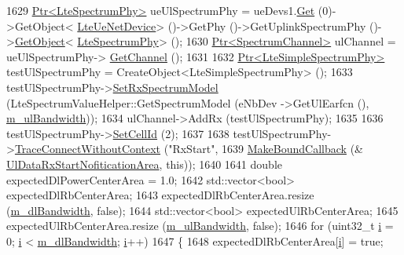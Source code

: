 \begin{DoxyCode}
1629   \hyperlink{classns3_1_1Ptr}{Ptr<LteSpectrumPhy>} ueUlSpectrumPhy = ueDevs1.\hyperlink{classns3_1_1NetDeviceContainer_a677d62594b5c9d2dea155cc5045f4d0b}{Get} (0)->GetObject<
      \hyperlink{classns3_1_1LteUeNetDevice}{LteUeNetDevice}> ()->GetPhy ()->GetUplinkSpectrumPhy ()->\hyperlink{classns3_1_1Object_a13e18c00017096c8381eb651d5bd0783}{GetObject}<
      \hyperlink{classns3_1_1LteSpectrumPhy}{LteSpectrumPhy}> ();
1630   \hyperlink{classns3_1_1Ptr}{Ptr<SpectrumChannel>} ulChannel = ueUlSpectrumPhy->
      \hyperlink{classns3_1_1LteSpectrumPhy_a50f13e43568687ee32c5d63e5bf639c2}{GetChannel} ();
1631 
1632   \hyperlink{classns3_1_1Ptr}{Ptr<LteSimpleSpectrumPhy>} testUlSpectrumPhy = CreateObject<LteSimpleSpectrumPhy>
       ();
1633   testUlSpectrumPhy->\hyperlink{classns3_1_1LteSimpleSpectrumPhy_a1cbc14b5951a6c9360d3b180760429d9}{SetRxSpectrumModel} (LteSpectrumValueHelper::GetSpectrumModel (eNbDev
      ->GetUlEarfcn (), \hyperlink{classLteFrAreaTestCase_afa54487d9f12658bbead39e1272f4d8c}{m\_ulBandwidth}));
1634   ulChannel->AddRx (testUlSpectrumPhy);
1635 
1636   testUlSpectrumPhy->\hyperlink{classns3_1_1LteSimpleSpectrumPhy_aed3e4883b1f03358a744746b08fbd5d8}{SetCellId} (2);
1637 
1638   testUlSpectrumPhy->\hyperlink{classns3_1_1ObjectBase_a1be45f6fd561e75dcac9dfa81b2b81e4}{TraceConnectWithoutContext} (\textcolor{stringliteral}{"RxStart"},
1639                                                  \hyperlink{group__makeboundcallback_ga1725d6362e6065faa0709f7c93f8d770}{MakeBoundCallback} (&
      \hyperlink{lte-test-frequency-reuse_8cc_a1011b9d239710e3f627e9aada5d64778}{UlDataRxStartNofiticationArea}, \textcolor{keyword}{this}));
1640 
1641   \textcolor{keywordtype}{double} expectedDlPowerCenterArea = 1.0;
1642   std::vector<bool> expectedDlRbCenterArea;
1643   expectedDlRbCenterArea.resize (\hyperlink{classLteFrAreaTestCase_a645fc2cea287afbd373f6d702152cf47}{m\_dlBandwidth}, \textcolor{keyword}{false});
1644   std::vector<bool> expectedUlRbCenterArea;
1645   expectedUlRbCenterArea.resize (\hyperlink{classLteFrAreaTestCase_afa54487d9f12658bbead39e1272f4d8c}{m\_ulBandwidth}, \textcolor{keyword}{false});
1646   \textcolor{keywordflow}{for} (uint32\_t \hyperlink{bernuolliDistribution_8m_a6f6ccfcf58b31cb6412107d9d5281426}{i} = 0; \hyperlink{bernuolliDistribution_8m_a6f6ccfcf58b31cb6412107d9d5281426}{i} < \hyperlink{classLteFrAreaTestCase_a645fc2cea287afbd373f6d702152cf47}{m\_dlBandwidth}; \hyperlink{bernuolliDistribution_8m_a6f6ccfcf58b31cb6412107d9d5281426}{i}++)
1647     \{
1648       expectedDlRbCenterArea[\hyperlink{bernuolliDistribution_8m_a6f6ccfcf58b31cb6412107d9d5281426}{i}] = \textcolor{keyword}{true};

\end{DoxyCode}
